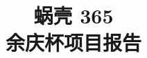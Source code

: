 \documentclass[twocolumn]{article}
\title{%
蜗壳 365\\
\large 余庆杯项目报告}
\author{}
\date{}
\begin{document}
\twocolumn[\maketitle

\vskip\baselineskip]




% 
% 

% 
% 
\end{document}
